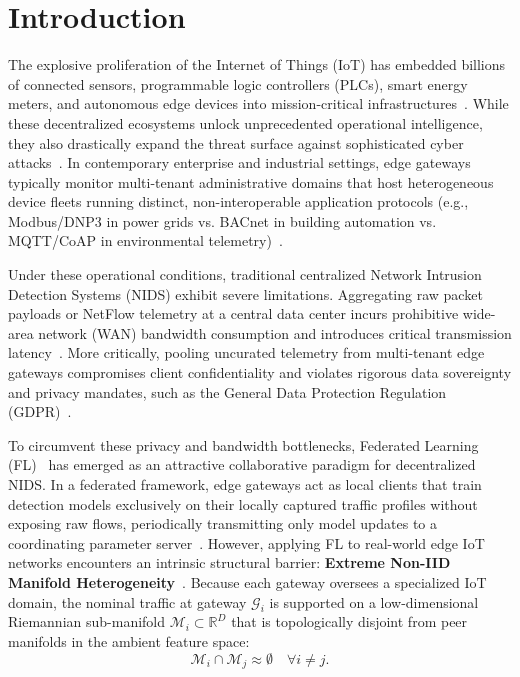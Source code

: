 
\section{Introduction}
\label{sec:intro}

The explosive proliferation of the Internet of Things (IoT) has embedded billions of connected sensors, programmable logic controllers (PLCs), smart energy meters, and autonomous edge devices into mission-critical infrastructures~\cite{eskandari2020passban,dinh2020federated}. While these decentralized ecosystems unlock unprecedented operational intelligence, they also drastically expand the threat surface against sophisticated cyber attacks~\cite{sommer2010outside,sarhan2023evaluating}. In contemporary enterprise and industrial settings, edge gateways typically monitor multi-tenant administrative domains that host heterogeneous device fleets running distinct, non-interoperable application protocols (e.g., Modbus/DNP3 in power grids vs. BACnet in building automation vs. MQTT/CoAP in environmental telemetry)~\cite{ferrag2022edgeiiotset}. 

Under these operational conditions, traditional centralized Network Intrusion Detection Systems (NIDS) exhibit severe limitations. Aggregating raw packet payloads or NetFlow telemetry at a central data center incurs prohibitive wide-area network (WAN) bandwidth consumption and introduces critical transmission latency~\cite{wang2019adaptive}. More critically, pooling uncurated telemetry from multi-tenant edge gateways compromises client confidentiality and violates rigorous data sovereignty and privacy mandates, such as the General Data Protection Regulation (GDPR)~\cite{truex2019hybrid,nasr2019comprehensive}.

To circumvent these privacy and bandwidth bottlenecks, Federated Learning (FL)~\cite{mcmahan2017communication,li2020federated} has emerged as an attractive collaborative paradigm for decentralized NIDS. In a federated framework, edge gateways act as local clients that train detection models exclusively on their locally captured traffic profiles without exposing raw flows, periodically transmitting only model updates to a coordinating parameter server~\cite{rey2022federated,wang2022fedod}. However, applying FL to real-world edge IoT networks encounters an intrinsic structural barrier: \textbf{Extreme Non-IID Manifold Heterogeneity}~\cite{hsu2019measuring}. Because each gateway oversees a specialized IoT domain, the nominal traffic at gateway $\mathcal{G}_i$ is supported on a low-dimensional Riemannian sub-manifold $\mathcal{M}_i \subset \mathbb{R}^D$ that is topologically disjoint from peer manifolds in the ambient feature space:
\begin{equation}
\label{eq:intro_disjoint}
\mathcal{M}_i \cap \mathcal{M}_j \approx \emptyset \quad \forall i \neq j.
\end{equation}

